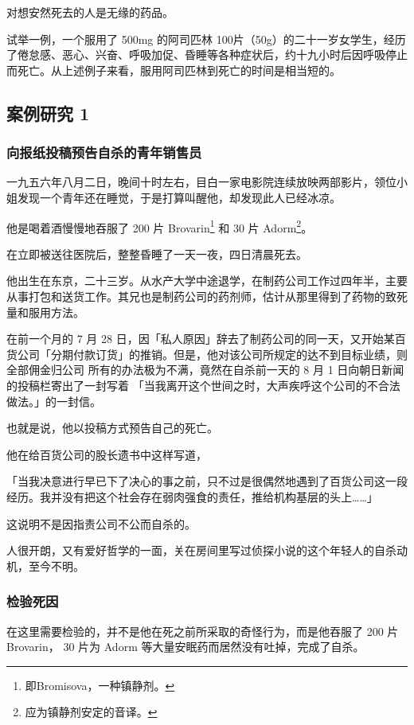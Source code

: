 \documentclass[UTF8]{ctexart}
\begin{document}
对想安然死去的人是无缘的药品。

试举一例，一个服用了 500mg 的阿司匹林 100片（50g）的二十一岁女学生，经历了倦怠感、恶心、兴奋、呼吸加促、昏睡等各种症状后，约十九小时后因呼吸停止而死亡。从上述例子来看，服用阿司匹林到死亡的时间是相当短的。

\subsection{案例研究 1}

\subsubsection*{向报纸投稿预告自杀的青年销售员}

一九五六年八月二日，晚间十时左右，目白一家电影院连续放映两部影片，领位小姐发现一个青年还在睡觉，于是打算叫醒他，却发现此人已经冰凉。

他是喝着酒慢慢地吞服了 200 片 Brovarin\footnote{即Bromisova，一种镇静剂。} 和 30 片 Adorm\footnote{应为镇静剂安定的音译。}。

在立即被送往医院后，整整昏睡了一天一夜，四日清晨死去。

他出生在东京，二十三岁。从水产大学中途退学，在制药公司工作过四年半，主要从事打包和送货工作。其兄也是制药公司的药剂师，估计从那里得到了药物的致死量和服用方法。

在前一个月的 7 月 28 日，因「私人原因」辞去了制药公司的同一天，又开始某百货公司「分期付款订货」的推销。但是，他对该公司所规定的达不到目标业绩，则全部佣金归公司 所有的办法极为不满，竟然在自杀前一天的 8 月 1 日向朝日新闻的投稿栏寄出了一封写着 「当我离开这个世间之时，大声疾呼这个公司的不合法做法。」的一封信。

也就是说，他以投稿方式预告自己的死亡。

他在给百货公司的股长遗书中这样写道，

「当我决意进行早已下了决心的事之前，只不过是很偶然地遇到了百货公司这一段经历。我并没有把这个社会存在弱肉强食的责任，推给机构基层的头上……」

这说明不是因指责公司不公而自杀的。

人很开朗，又有爱好哲学的一面，关在房间里写过侦探小说的这个年轻人的自杀动机，至今不明。

\subsubsection*{检验死因}

在这里需要检验的，并不是他在死之前所采取的奇怪行为，而是他吞服了 200 片 Brovarin，
30 片为 Adorm 等大量安眠药而居然没有吐掉，完成了自杀。
\end{document}
